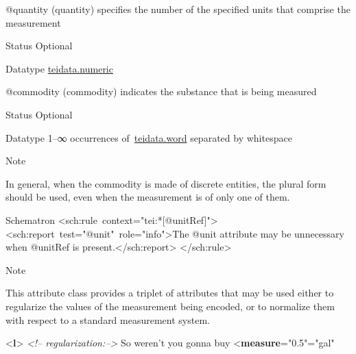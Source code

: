 \begin{reflist}
\begin{sansreflist}
\begin{reflist}
\end{reflist}  
    \item[@quantity]
  (quantity) specifies the number of the specified units that comprise the measurement
\begin{reflist}
    \item[{Status}]
  Optional
    \item[{Datatype}]
  \hyperref[TEI.teidata.numeric]{teidata.numeric}
\end{reflist}  
    \item[@commodity]
  (commodity) indicates the substance that is being measured
\begin{reflist}
    \item[{Status}]
  Optional
    \item[{Datatype}]
  1–∞ occurrences of \hyperref[TEI.teidata.word]{teidata.word} separated by whitespace
    \item[{Note}]
  \par
In general, when the commodity is made of discrete entities, the plural form should be used, even when the measurement is of only one of them.
\end{reflist}  
\end{sansreflist}  
    \item[{Schematron}]
   <sch:rule context="tei:*[@unitRef]"> <sch:report test="@unit" role="info">The @unit attribute may be unnecessary when @unitRef is present.</sch:report> </sch:rule>
    \item[{Note}]
  \par
This attribute class provides a triplet of attributes that may be used either to regularize the values of the measurement being encoded, or to normalize them with respect to a standard measurement system. \par\bgroup{}\exampleFont \begin{shaded}\noindent\mbox{}{<\textbf{l}>}\mbox{}\newline 
\textit{<!-- regularization:-->}\mbox{}\newline 
 So weren't you gonna buy {<\textbf{measure}\hspace*{1em}{quantity}="{0.5}"\hspace*{1em}{unit}="{gal}"\mbox{}\newline 
}
\end{shaded}
\end{reflist}
